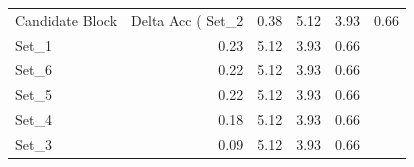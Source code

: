 \begin{tabular}{lrrrr}
\toprule
Candidate Block & Delta Acc (%
\midrule
Set_2 & 0.38 & 5.12 & 3.93 & 0.66 \\
Set_1 & 0.23 & 5.12 & 3.93 & 0.66 \\
Set_6 & 0.22 & 5.12 & 3.93 & 0.66 \\
Set_5 & 0.22 & 5.12 & 3.93 & 0.66 \\
Set_4 & 0.18 & 5.12 & 3.93 & 0.66 \\
Set_3 & 0.09 & 5.12 & 3.93 & 0.66 \\
\bottomrule
\end{tabular}
